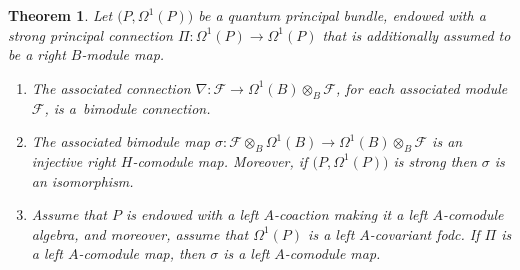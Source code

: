 \documentclass[10pt,a4paper]{amsart}
\numberwithin{equation}{section}
\newtheorem{Theorem}{Theorem}[section]
\begin{document}
\begin{Theorem}\label{thm:theTheorem}
Let $\big(P, \Omega^1(P)\big)$ be a quantum principal bundle, endowed with a strong principal connection $\Pi\colon \Omega^1(P) \to \Omega^1(P)$ that is additionally assumed to be a right $B$-module map.
\begin{enumerate}\itemsep=0pt
 \item[$1.$] The associated connection $\nabla\colon \mathcal{F} \to \Omega^1(B) \otimes_B \mathcal{F}$, for each associated module $\mathcal{F}$, is a~bimodule connection.
 \item[$2.$] The associated bimodule map $\sigma\colon \mathcal{F} \otimes_B \Omega^1(B) \to \Omega^1(B) \otimes_B \mathcal{F}$ is an injective right $H$-comodule map. Moreover, if $\big(P, \Omega^1(P)\big)$ is strong then $\sigma$ is an isomorphism.
 \item[$3.$] Assume that $P$ is endowed with a left $A$-coaction making it a left $A$-comodule algebra, and moreover, assume that $\Omega^1(P)$ is a left $A$-covariant fodc. If $\Pi$ is a left $A$-comodule map, then $\sigma$ is a left $A$-comodule map.
 \end{enumerate}
\end{Theorem}
\end{document}

